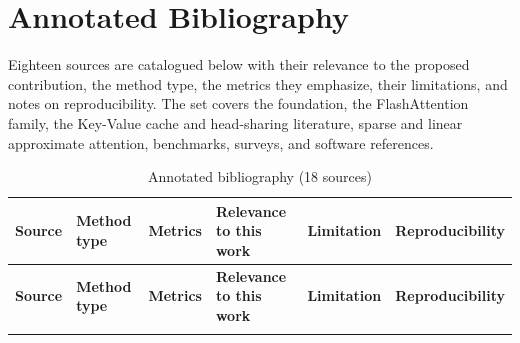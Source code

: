 \documentclass[11pt]{article}
\begin{document}
\section{Annotated Bibliography}
\label{sec:annotated-bib}

Eighteen sources are catalogued below with their relevance to the proposed contribution, the method type, the metrics they emphasize, their limitations, and notes on reproducibility. The set covers the foundation, the FlashAttention family, the Key-Value cache and head-sharing literature, sparse and linear approximate attention, benchmarks, surveys, and software references.

\begin{small}
\begin{longtable}{p{2.4cm} p{1.6cm} p{1.6cm} p{2.5cm} p{2.2cm} p{2.5cm}}
\caption{Annotated bibliography (18 sources)}
\label{tab:annot-bib} \\
\toprule
\textbf{Source} & \textbf{Method type} & \textbf{Metrics} & \textbf{Relevance to this work} & \textbf{Limitation} & \textbf{Reproducibility} \\
\midrule
\endfirsthead
\toprule
\textbf{Source} & \textbf{Method type} & \textbf{Metrics} & \textbf{Relevance to this work} & \textbf{Limitation} & \textbf{Reproducibility} \\
\midrule
\endhead
\bottomrule
\endfoot


\end{longtable}
\end{small}
\end{document}
